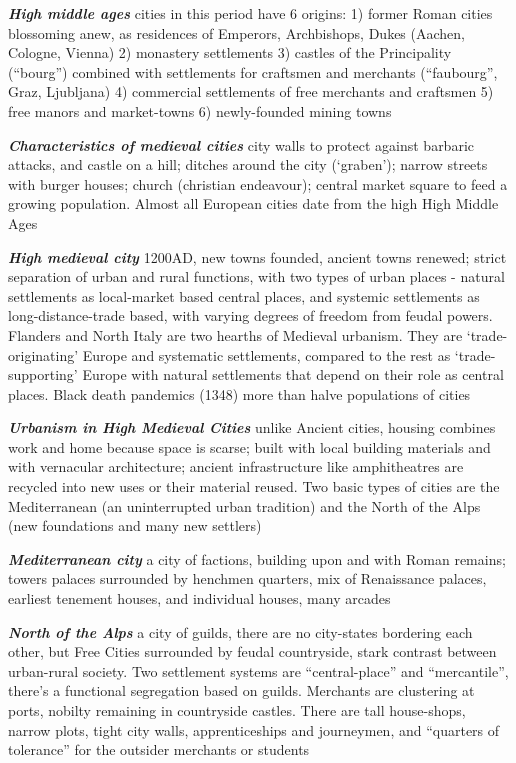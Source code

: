 \documentclass{article}
\newcommand{\bisection}[1]{\textbf{\textit{#1}}}
\begin{document}
\bisection{High middle ages} cities in this period have 6 origins:
1) former Roman cities blossoming anew, as residences of Emperors, Archbishops, Dukes (Aachen, Cologne, Vienna)
2) monastery settlements
3) castles of the Principality (``bourg'') combined with settlements for craftsmen and merchants (``faubourg'', Graz, Ljubljana)
4) commercial settlements of free merchants and craftsmen
5) free manors and market-towns
6) newly-founded mining towns

\bisection{Characteristics of medieval cities} city walls to protect against barbaric attacks, and castle on a hill; ditches around the city (`graben'); narrow streets with burger houses; church (christian endeavour); central market square to feed a growing population. Almost all European cities date from the high High Middle Ages

\bisection{High medieval city} 1200AD, new towns founded, ancient towns renewed; strict separation of urban and rural functions, with two types of urban places - natural settlements as local-market based central places, and systemic settlements as long-distance-trade based, with varying degrees of freedom from feudal powers. Flanders and North Italy are two hearths of Medieval urbanism. They are `trade-originating' Europe and systematic settlements, compared to the rest as `trade-supporting' Europe with natural settlements that depend on their role as central places. Black death pandemics (1348) more than halve populations of cities

\bisection{Urbanism in High Medieval Cities} unlike Ancient cities, housing combines work and home because space is scarse; built with local building materials and with vernacular architecture; ancient infrastructure like amphitheatres are recycled into new uses or their material reused. Two basic types of cities are the Mediterranean (an uninterrupted urban tradition) and the North of the Alps (new foundations and many new settlers)

\bisection{Mediterranean city} a city of factions, building upon and with Roman remains; towers palaces surrounded by henchmen quarters, mix of Renaissance palaces, earliest tenement houses, and individual houses, many arcades

\bisection{North of the Alps} a city of guilds, there are no city-states bordering each other, but Free Cities surrounded by feudal countryside, stark contrast between urban-rural society. Two settlement systems are ``central-place'' and ``mercantile'', there's a functional segregation based on guilds. Merchants are clustering at ports, nobilty remaining in countryside castles. There are tall house-shops, narrow plots, tight city walls, apprenticeships and journeymen, and ``quarters of tolerance'' for the outsider merchants or students
\end{document}
